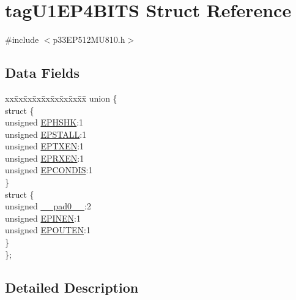 \hypertarget{structtag_u1_e_p4_b_i_t_s}{}\section{tag\+U1\+E\+P4\+B\+I\+TS Struct Reference}
\label{structtag_u1_e_p4_b_i_t_s}


{\ttfamily \#include $<$p33\+E\+P512\+M\+U810.\+h$>$}

\subsection*{Data Fields}
\begin{DoxyCompactItemize}
\item 
\begin{tabbing}
xx\=xx\=xx\=xx\=xx\=xx\=xx\=xx\=xx\=\kill
union \{\\
\>struct \{\\
\>\>unsigned \hyperlink{structtag_u1_e_p4_b_i_t_s_a0d06430217cb4b189fbe9d0c4b460482}{EPHSHK}:1\\
\>\>unsigned \hyperlink{structtag_u1_e_p4_b_i_t_s_a47042104f04ebe06a23f9789bd400d7e}{EPSTALL}:1\\
\>\>unsigned \hyperlink{structtag_u1_e_p4_b_i_t_s_aa2d88c1be513e759c136823c86a355b4}{EPTXEN}:1\\
\>\>unsigned \hyperlink{structtag_u1_e_p4_b_i_t_s_a8a388d32ceffb87230e660b6793f2857}{EPRXEN}:1\\
\>\>unsigned \hyperlink{structtag_u1_e_p4_b_i_t_s_a1bd26df05d2b5a11b20ee548fce90c3e}{EPCONDIS}:1\\
\>\} \\
\>struct \{\\
\>\>unsigned \hyperlink{structtag_u1_e_p4_b_i_t_s_adf71f3d8410c1f1dbbc96680a92c49af}{\_\_pad0\_\_}:2\\
\>\>unsigned \hyperlink{structtag_u1_e_p4_b_i_t_s_a8b6d98cdf233ac90ff19d16d9a89215e}{EPINEN}:1\\
\>\>unsigned \hyperlink{structtag_u1_e_p4_b_i_t_s_adf87e8acfbb27a5626e21b3e3bd106fd}{EPOUTEN}:1\\
\>\} \\
\}; \\

\end{tabbing}\end{DoxyCompactItemize}


\subsection{Detailed Description}


